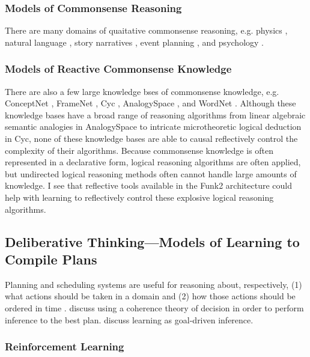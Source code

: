 \subsubsection{Models of Commonsense Reasoning}

There are many domains of quaitative commonsense reasoning, e.g. physics \cite[]{forbus:1994}, natural language \cite[]{liu:2004b}, story narratives \cite[]{williams:2005}, event planning \cite[]{smith:2006}, and psychology \cite[]{gordon:2008}.

\subsubsection{Models of Reactive Commonsense Knowledge}

There are also a few large knowledge bses of commonsense knowledge, e.g. ConceptNet \cite[]{liu:2004a}, FrameNet \cite[]{baker:1998}, Cyc \cite[]{lenat:1990}, AnalogySpace \cite[]{speer:2009}, and WordNet \cite[]{fellbaum:1998}.
Although these knowledge bases have a broad range of reasoning algorithms from linear algebraic semantic analogies in AnalogySpace to intricate microtheoretic logical deduction in Cyc, none of these knowledge bases are able to causal reflectively control the complexity of their algorithms.
Because commonsense knowledge is often represented in a declarative form, logical reasoning algorithms are often applied, but undirected logical reasoning methods often cannot handle large amounts of knowledge.
I see that reflective tools available in the Funk2 architecture could help with learning to reflectively control these explosive logical reasoning algorithms.

\subsection{Deliberative Thinking---Models of Learning to Compile Plans}

Planning and scheduling systems are useful for reasoning about, respectively, (1) what actions should be taken in a domain and (2) how those actions should be ordered in time \citep{smith:2000}.
\cite{thagard:1995} discuss using a coherence theory of decision in order to perform inference to the best plan.
\cite{michalski:1995} discuss learning as goal-driven inference.

\subsubsection{Reinforcement Learning}

